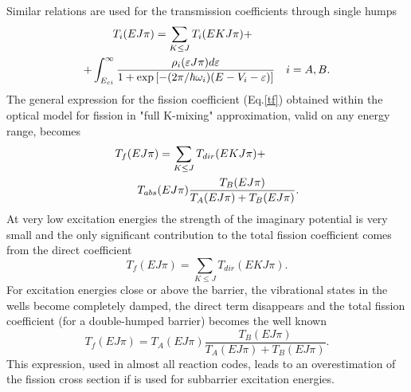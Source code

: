 Similar relations are used for the transmission coefficients through single
humps
\begin{eqnarray}
T_{i}(EJ\pi)=\sum_{K\le J}T_{i}(EKJ\pi) +\qquad\qquad\qquad\quad  \notag \\
+ \int_{E_{ci}}^{\infty} \frac {\rho_{i}(\varepsilon J\pi)d\varepsilon} {%
1+\exp\left[ -({2\pi}/\hbar\omega_{i}) (E-V_{i}-\varepsilon)\right] } \quad
i=A,B.  \label{tfi}
\end{eqnarray}
The general expression for the fission coefficient (Eq.\ref{tf}) obtained
within the optical model for fission in "full K-mixing" approximation, valid
on any energy range, becomes
\begin{eqnarray}
T_{f}(EJ\pi)=\sum_{K\le J}T_{dir}(EKJ\pi)+\qquad\quad  \notag \\
T_{abs}(E J \pi)\frac{T_{B}(E J \pi)}{T_{A}(E J \pi)+T_{B}(E J \pi)}.
\label{tfis}
\end{eqnarray}
At very low excitation energies the strength of the imaginary potential is
very small and the only significant contribution to the total fission
coefficient comes from the direct coefficient
\begin{equation}
T_{f}(EJ\pi)=\sum_{K\le J}T_{dir}(EKJ\pi).  \label{tf-zero}
\end{equation}
For excitation energies close or above the barrier, the vibrational states
in the wells become completely damped, the direct term disappears and the
total fission coefficient (for a double-humped barrier) becomes the well
known
\begin{equation}
T_{f}(E J \pi)=T_{A}(E J \pi)\frac{T_{B}(E J \pi)}{T_{A}(E J \pi)+T_{B}(E J
\pi)}.  \label{tf-full}
\end{equation}
This expression, used in almost all reaction codes, leads to an
overestimation of the fission cross section if is used for subbarrier
excitation energies.

